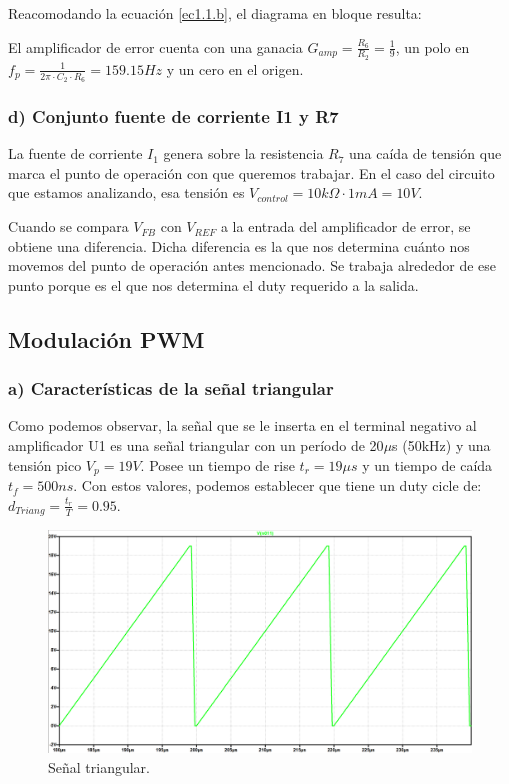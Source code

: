 \documentclass[e4_tp2_main.tex]{subfiles}
\begin{document}
Reacomodando la ecuaci\'on \eqref{ec1.1.b}, el diagrama en bloque resulta: 

\begin{center}
\end{center}


El amplificador de error cuenta con una ganacia $G_{amp}=\frac{R_6}{R_2} =\frac{1}{9}$, un polo en $f_p=\frac{1}{2 \pi \cdot C_2 \cdot R_6 }=159.15Hz$ y un cero en el origen.


\subsubsection*{d) Conjunto fuente de corriente I1 y R7}
La fuente de corriente $I_1$ genera sobre la resistencia $R_7$ una ca\'ida de tensi\'on que marca el punto de operaci\'on con que queremos trabajar. En el caso del circuito que estamos analizando, esa tensi\'on es $V_{control}=10k\Omega \cdot 1mA =10V$. 

Cuando se compara $V_{FB}$ con $V_{REF}$ a la entrada del amplificador de error, se obtiene una diferencia. Dicha diferencia es la que nos determina cu\'anto nos movemos del punto de operaci\'on antes mencionado. Se trabaja alrededor de ese punto porque es el que nos determina el duty requerido a la salida.

\subsection{Modulaci\'on PWM}


\subsubsection*{a) Caracter\'isticas de la se\~nal triangular}
Como podemos observar, la señal que se le inserta en el terminal negativo al amplificador U1 es una señal triangular con un período de 20$\mu $s (50kHz) y una tensión pico $V_p=19 V$. Posee un tiempo de rise $t_r=19 \mu s$ y un tiempo de caída $t_f=500ns$. Con estos valores, podemos establecer que tiene un duty cicle de: $d_{Triang}= \frac{t_r}{T}=0.95$. 
\begin{figure}[H]
\centering
\includegraphics[width=0.4\linewidth]{Imagenes/Punto1/triang_shape.png}
\caption{Señal triangular.}
\end{figure}
\end{document}
